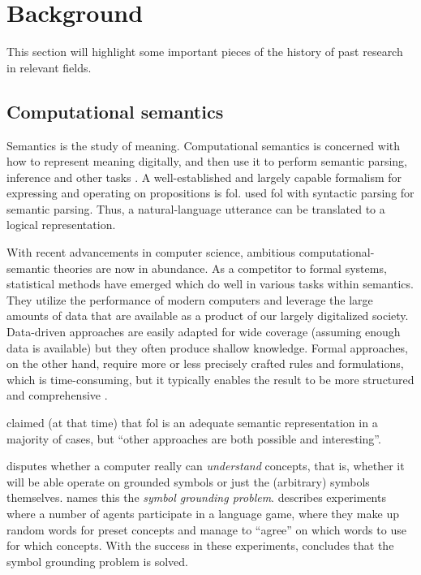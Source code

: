 \glsresetall
\section{Background}
\label{sec:background}

This section will highlight some important pieces of the history of past research in relevant fields.

\subsection{Computational semantics}

Semantics is the study of meaning.
Computational semantics is concerned with how to represent meaning digitally, and then use it to perform semantic parsing, inference and other tasks \citep{BlackburnComputationalsemantics2003}.
A well-established and largely capable formalism for expressing and operating on propositions is \gls{fol}.
\cite{MontagueFormalPhilosophySelected1974} used \gls{fol} with syntactic parsing for semantic parsing.
Thus, a natural-language utterance can be translated to a logical representation.

With recent advancements in computer science, ambitious computational-semantic theories are now in abundance.
As a competitor to formal systems, statistical methods have emerged which do well in various tasks within semantics.
They utilize the performance of modern computers and leverage the large amounts of data that are available as a product of our largely digitalized society.
Data-driven approaches are easily adapted for wide coverage (assuming enough data is available) but they often produce shallow knowledge.
Formal approaches, on the other hand, require more or less precisely crafted rules and formulations, which is time-consuming, but it typically enables the result to be more structured and comprehensive \citep{Dobnik:2017ag}.

\cite{BlackburnComputationalsemantics2003} claimed (at that time) that \gls{fol} is an adequate semantic representation in a majority of cases, but ``other approaches are both possible and interesting''.

\cite{SearleMindsbrainsprograms1980} disputes whether a computer really can \textit{understand} concepts, that is, whether it will be able operate on grounded symbols or just the (arbitrary) symbols themselves.
\cite{HarnadSymbolGroundingProblem1990} names this the \textit{symbol grounding problem}.
\cite{SteelsSymbolGroundingProblem2007} describes experiments where a number of agents participate in a language game, where they make up random words for preset concepts and manage to ``agree'' on which words to use for which concepts.
With the success in these experiments, \citeauthor{SteelsSymbolGroundingProblem2007} concludes that the symbol grounding problem is solved.



